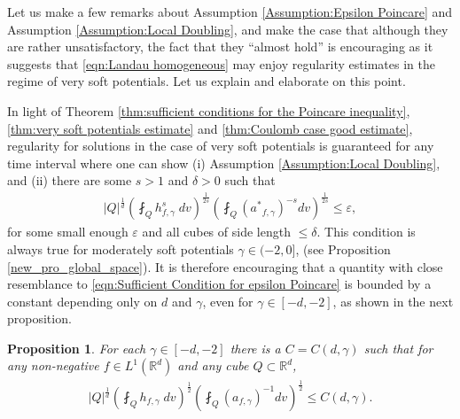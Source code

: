 \documentclass[12pt,american]{amsart}
\numberwithin{equation}{section}
\theoremstyle{plain}
\newtheorem{prop}[thm]{Proposition}
\theoremstyle{definition}                  %
\def\astar{{a^*}}
\begin{document}
Let us make a few remarks about Assumption \ref{Assumption:Epsilon Poincare} and Assumption \ref{Assumption:Local Doubling}, and make the case that although they are rather unsatisfactory, the fact that they ``almost hold'' is encouraging as it suggests that \eqref{eqn:Landau homogeneous} may enjoy regularity estimates in the regime of very soft potentials. Let us explain and elaborate on this point.

In light of Theorem \ref{thm:sufficient conditions for the Poincare inequality}, \ref{thm:very soft potentials estimate} and \ref{thm:Coulomb case good estimate}, regularity for solutions in the case of very soft potentials is guaranteed for any time interval where one can show (i) Assumption \ref{Assumption:Local Doubling}, and (ii) there are some $s>1$ and $\delta>0$ such that
\begin{align}\label{eqn:Sufficient Condition for epsilon Poincare}
  |Q|^{\frac{1}{d}}\left ( \fint_{Q}h_{f,\gamma}^s\;dv\right )^{\frac{1}{2s}}\left (\fint_{Q} (\astar_{f,\gamma})^{-s} dv\right )^{\frac{1}{2s}}  \leq  \varepsilon,
\end{align}
for some small enough $\varepsilon$ and all cubes of side length $\leq \delta$. This condition is always true for moderately soft potentials $\gamma \in (-2,0]$,  (see Proposition \ref{new_pro_global_space}).  It is therefore encouraging that a quantity with close resemblance to \eqref{eqn:Sufficient Condition for epsilon Poincare} is bounded by a constant depending only on $d$ and $\gamma$, even for $\gamma \in [-d,-2]$, as shown in the next proposition. 


\begin{prop}\label{prop:assumption 1 almost holds}
   For each $\gamma \in [-d,-2]$ there is a  $C=C(d,\gamma)$ such that for any non-negative $f\in L^1(\mathbb{R}^d)$ and any cube $Q \subset \mathbb{R}^d$,
  \begin{align}\label{eqn:assumption 1 almost holds ratio}
    |Q|^{\frac{1}{d}}\left ( \fint_{Q}h_{f,\gamma}\;dv \right )^{\frac{1}{2}}\left ( \fint_{Q} (a_{f,\gamma})^{-1} dv\right )^{\frac{1}{2}}   \leq C(d,\gamma). 
  \end{align}
\end{prop}  
\end{document}
